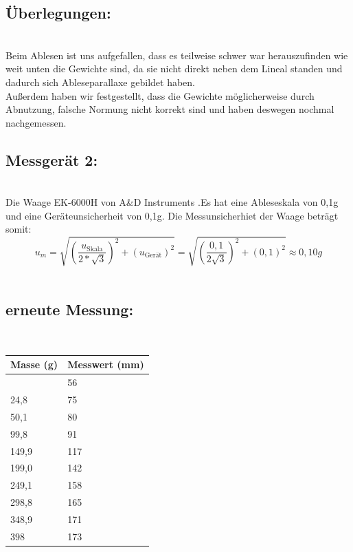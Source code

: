 \documentclass[11pt]{article}
\begin{document}
    \subsection{Überlegungen:}\\
    Beim Ablesen ist uns aufgefallen, dass es teilweise schwer war
    herauszufinden wie weit unten die Gewichte sind, da sie nicht direkt
    neben dem Lineal standen und dadurch sich Ableseparallaxe gebildet
    haben.\\
    
    Außerdem haben wir festgestellt, dass die Gewichte möglicherweise durch
    Abnutzung, falsche Normung nicht korrekt sind und haben deswegen nochmal
    nachgemessen.
    
    \subsection{Messgerät 2:}\\
    Die Waage EK-6000H von A\&D Instruments .Es hat eine Ableseskala von
    0,1g und eine Geräteunsicherheit von 0,1g. Die Messunsicherhiet der
    Waage beträgt somit:\\
    \[
    u_m = \sqrt{(\frac{u_{\text{Skala}}}{2*\sqrt{3}})^2 + (u_{\text{Gerät}})^2} = \sqrt{\left(\frac{0,1}{2\sqrt{3}}\right)^2 + (0,1)^2} ≈ 0,10g
    \]\\

    \subsection{erneute Messung:}\\
    \begin{longtable}[]{@{}ll@{}}
    \toprule\noalign{}
    Masse (g) & Messwert (mm) \\
    \midrule\noalign{}
    \endhead
    \bottomrule\noalign{}
    \endlastfoot
    0 & 56 \\
    24,8 & 75 \\
    50,1 & 80 \\
    99,8 & 91 \\
    149,9 & 117 \\
    199,0 & 142 \\
    249,1 & 158 \\
    298,8 & 165 \\
    348,9 & 171 \\
    398 & 173 \\
    \end{longtable}
\end{document}
